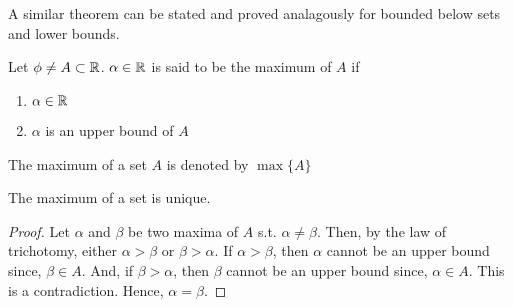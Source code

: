 \documentclass{scrartcl}
\begin{document}
    A similar theorem can be stated and proved analagously for bounded below sets and lower bounds.
    \begin{definition}[Maximum]
        Let $\phi \neq A \subset \mathbb{R}$. $\alpha \in \mathbb{R}$ is said to be the maximum of $A$ if 
        \begin{enumerate}[label={(\roman*)}]
            \item $\alpha \in \mathbb{R}$
            \item $\alpha$ is an upper bound of $A$ 
        \end{enumerate}
        The maximum of a set $A$ is denoted by $\max\{A\}$
    \end{definition}
    \begin{theorem}
        The maximum of a set is unique.
        \begin{proof}
            Let $\alpha$ and $\beta$ be two maxima of $A$ s.t. $\alpha \neq \beta$. Then, by the law of trichotomy,
            either $\alpha > \beta$ or $\beta > \alpha$. 
            If $\alpha > \beta$, then $\alpha$ cannot be an upper bound since, $\beta \in A$. And,
            if $\beta > \alpha$, then $\beta$ cannot be an upper bound since, $\alpha \in A$. This is a contradiction. 
            Hence, $\alpha = \beta$.
        \end{proof}
    \end{theorem}
\end{document}
